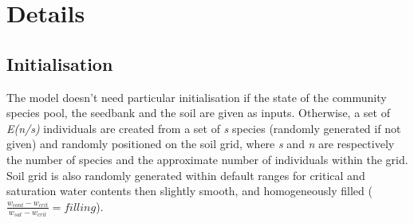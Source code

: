 \documentclass[a4paper,twoside, justified,marginals=raggedright]{tufte-handout}
\begin{document}
%

\section{Details}

\subsection{Initialisation}
The model doesn't need particular initialisation if the state of the community species pool, the seedbank and the soil are given as inputs. Otherwise, a set of \textit{E(n/s)} individuals are created from a set of \textit{s} species (randomly generated if not given) and randomly positioned on the soil grid, where \textit{s} and \textit{n} are respectively the number of species and the approximate number of individuals within the grid. Soil grid is also randomly generated within default ranges for critical and saturation water contents then slightly smooth, and homogeneously filled ($ \frac{w_{cont} - w_{crit}}{w_{sat} - w_{crit}} = filling$).
\end{document}
